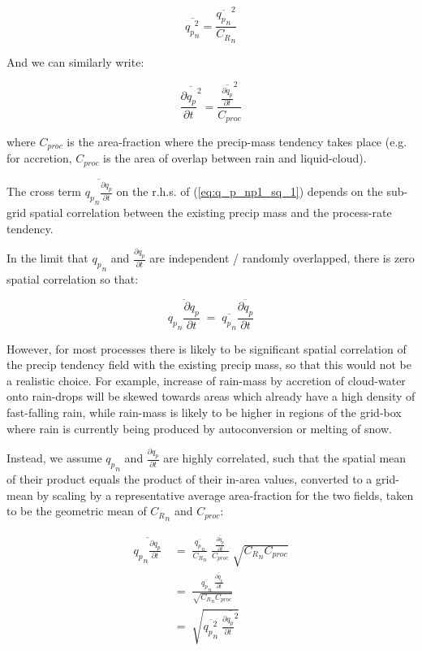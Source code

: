 \documentclass{UMDP_article}
\begin{document}
\begin{equation} \label{eq:qpn_sq}
\overline{ {q_p}_n^2 } = \frac{ \overline{{q_p}_n}^2 }{ {C_R}_n }
\end{equation}

And we can similarly write:

\begin{equation} \label{eq:dqpdt_sq}
\overline{ \frac{\partial q_p}{\partial t}^2 }
 = \frac{ \overline{\frac{\partial q_p}{\partial t}}^2 }{ C_{proc} }
\end{equation}

where $C_{proc}$ is the area-fraction where the precip-mass tendency takes
place (e.g. for accretion, $C_{proc}$ is the area of overlap between rain
and liquid-cloud).

The cross term $\overline{ {q_p}_n \frac{\partial q_p}{\partial t} }$
on the r.h.s. of (\ref{eq:q_p_np1_sq_1})
depends on the sub-grid spatial correlation between the existing
precip mass and the process-rate tendency.

In the limit that ${q_p}_n$ and $\frac{\partial q_p}{\partial t}$
are independent / randomly overlapped, there is zero spatial correlation
so that:

\[
\overline{ {q_p}_n \frac{\partial q_p}{\partial t} }
 \; = \; \overline{ {q_p}_n } \overline{ \frac{\partial q_p}{\partial t} }
\]

However, for most processes there is likely to be significant spatial
correlation of the precip tendency field with the existing precip mass,
so that this would not be a realistic choice.
For example, increase of rain-mass by accretion
of cloud-water onto rain-drops will be skewed towards areas which already
have a high density of fast-falling rain, while rain-mass is likely to
be higher in regions of the grid-box where rain is currently being
produced by autoconversion or melting of snow.

Instead, we assume ${q_p}_n$ and $\frac{\partial q_p}{\partial t}$
are highly correlated, such that the spatial mean of their product equals
the product of their in-area values,
converted to a grid-mean by scaling by a representative average area-fraction
for the two fields, taken to be the geometric mean of ${C_R}_n$ and $C_{proc}$:

\begin{align}
\overline{ {q_p}_n \frac{\partial q_p}{\partial t} }
 & \; = \; \frac{ \overline{ {q_p}_n } }{ {C_R}_n } \;
           \frac{ \overline{ \frac{\partial q_p}{\partial t} } }{ C_{proc} } \;
           \sqrt{ {C_R}_n C_{proc} }
\nonumber \\
 & \; = \; \frac{ \overline{ {q_p}_n } \;
                  \overline{ \frac{\partial q_p}{\partial t} } }
                { \sqrt{ {C_R}_n C_{proc} } }
\label{eq:cross_term_correl} \\
 & \; = \; \sqrt{ \overline{ {q_p}_n^2 } \;
                  \overline{ \frac{\partial q_p}{\partial t}^2 } }
\nonumber
\end{align}
\end{document}
